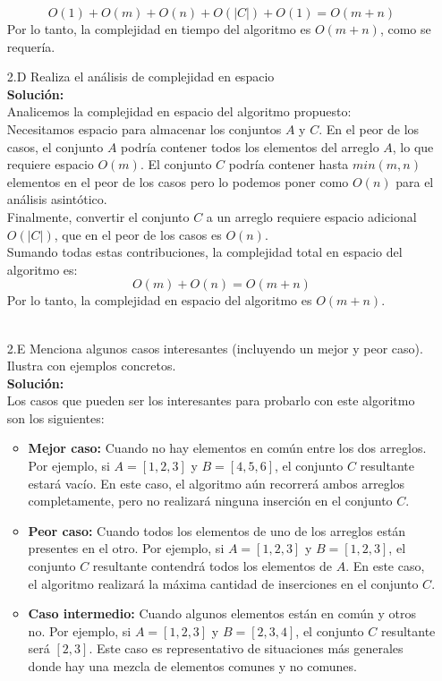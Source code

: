 \documentclass[12pt]{article}
\begin{document}
\begin{itemize}
    \[
    O(1) + O(m) + O(n) + O(|C|) + O(1) = O(m + n)
    \]
    Por lo tanto, la complejidad en tiempo del algoritmo es $O(m + n)$, como se requería.\\
    \item[2.D] Realiza el análisis de complejidad en espacio\\
    \textbf{Solución:}\\
    Analicemos la complejidad en espacio del algoritmo propuesto:\\
    Necesitamos espacio para almacenar los conjuntos $A$ y $C$. En el peor de los casos, el conjunto $A$ podría contener todos los elementos del arreglo $A$, lo que requiere espacio $O(m)$. El conjunto $C$ podría contener hasta $min(m, n)$ elementos en el peor de los casos pero lo podemos poner como $O(n)$ para el análisis asintótico.\\
    Finalmente, convertir el conjunto $C$ a un arreglo requiere espacio adicional $O(|C|)$, que en el peor de los casos es $O(n)$.\\
    Sumando todas estas contribuciones, la complejidad total en espacio del algoritmo es:
    \[
    O(m) + O(n) = O(m + n)
    \]
    Por lo tanto, la complejidad en espacio del algoritmo es $O(m + n)$.\\
    \\
    \item[2.E] Menciona algunos casos interesantes (incluyendo un mejor y peor caso). Ilustra con ejemplos concretos.\\
    \textbf{Solución:}\\
    Los casos que pueden ser los interesantes para probarlo con este algoritmo son los siguientes:
    \begin{itemize}
        \item \textbf{Mejor caso:} Cuando no hay elementos en común entre los dos arreglos. Por ejemplo, si $A = [1, 2, 3]$ y $B = [4, 5, 6]$, el conjunto $C$ resultante estará vacío. En este caso, el algoritmo aún recorrerá ambos arreglos completamente, pero no realizará ninguna inserción en el conjunto $C$.
        \item \textbf{Peor caso:} Cuando todos los elementos de uno de los arreglos están presentes en el otro. Por ejemplo, si $A = [1, 2, 3]$ y $B = [1, 2, 3]$, el conjunto $C$ resultante contendrá todos los elementos de $A$. En este caso, el algoritmo realizará la máxima cantidad de inserciones en el conjunto $C$.
        \item \textbf{Caso intermedio:} Cuando algunos elementos están en común y otros no. Por ejemplo, si $A = [1, 2, 3]$ y $B = [2, 3, 4]$, el conjunto $C$ resultante será $[2, 3]$. Este caso es representativo de situaciones más generales donde hay una mezcla de elementos comunes y no comunes.

\end{itemize}
\end{itemize}
\end{document}
